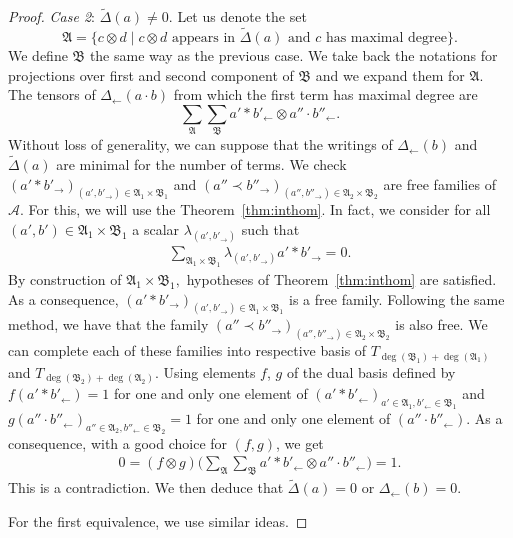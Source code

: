 \documentclass[10pt,a4paper]{amsart}
\numberwithin{equation}{section}
\theoremstyle{definition}
\theoremstyle{plain}
\begin{document}
\begin{proof}
	\textit{Case 2}: $\tilde{\Delta}(a)\neq 0$.
	Let us denote the set
	\[
	\mathfrak{A} = \big\{ c\otimes d\mid c\otimes d \text{ appears in }\tilde{\Delta}(a) \text{ and } c \text{ has maximal degree}\big\}.
	\] We define $\mathfrak{B}$ the same way as the previous case.
	We take back the notations for projections over first and second component of $\mathfrak{B}$ and we expand them for $\mathfrak{A}$. The tensors of $\Delta_{\leftarrow}(a\cdot b)$ from which the first term has maximal degree are
	\[
	\sum_{\mathfrak{A}}\sum_{\mathfrak{B}} a'*b'_{\leftarrow}\otimes a''\cdot b''_{\leftarrow}.
	\]
	Without loss of generality, we can suppose that the writings of $\Delta_{\leftarrow}(b)$ and $\tilde{\Delta}(a)$ are minimal for the number of terms.
		We check $(a'* b'_{\rightarrow})_{(a',b'_{\rightarrow})\in\mathfrak{A}_1\times \mathfrak{B}_1}$ and $(a''\prec b''_{\rightarrow})_{(a'',b''_{\rightarrow})\in\mathfrak{A}_2\times \mathfrak{B}_2}$ are free families of $\mathcal{A}$.
	For this, we will use the Theorem~\ref{thm:inthom}. In fact, we consider for all $(a',b')\in\mathfrak{A}_1\times \mathfrak{B}_1$ a scalar $\lambda_{(a',b'_{\rightarrow})}$ such that
	\begin{align*}
		\sum_{\mathfrak{A}_1\times \mathfrak{B}_1}\lambda_{(a',b'_{\rightarrow})}a'*b'_{\rightarrow}=0.
	\end{align*}
	By construction of $\mathfrak{A}_1\times \mathfrak{B}_1,$ hypotheses of Theorem~\ref{thm:inthom} are satisfied. As a consequence, $(a'*b'_{\rightarrow})_{(a',b'_{\rightarrow})\in\mathfrak{A}_1\times \mathfrak{B}_1}$ is a free family. Following the same method, we have that the family $(a''\prec b''_{\rightarrow})_{(a'',b''_{\rightarrow})\in\mathfrak{A}_2\times \mathfrak{B}_2}$ is also free.
	 We can complete each of these families into respective basis of $T_{\deg(\mathfrak{B}_1)+\deg(\mathfrak{A}_1)}$ and $T_{\deg(\mathfrak{B}_2)+\deg(\mathfrak{A}_2)}$.
	Using elements $f$, $g$ of the dual basis defined by ${f(a'*b'_{\leftarrow})=1}$ for one and only one element of $(a'*b'_{\leftarrow})_{a'\in\mathfrak{A}_1,b'_{\leftarrow}\in\mathfrak{B}_1}$ and $g(a''\cdot b''_{\leftarrow})_{a''\in\mathfrak{A}_2,b''_{\leftarrow}\in\mathfrak{B}_2}=1$ for one and only one element of $(a''\cdot b''_{\leftarrow})$.
	As a consequence, with a good choice for $(f,g)$, we get
	\begin{align*}
		0=(f\otimes g)\bigg( 	\sum_{\mathfrak{A}}\sum_{\mathfrak{B}} a'*b'_{\leftarrow}\otimes a''\cdot b''_{\leftarrow} \bigg)=1.
	\end{align*}
This is a contradiction. We then deduce that $\tilde{\Delta}(a)=0$ or $\Delta_{\leftarrow}(b)=0$.
	
	For the first equivalence, we use similar ideas.
\end{proof}
\end{document}
